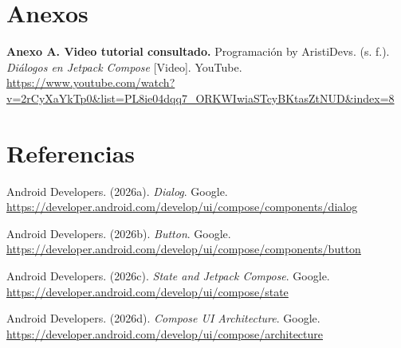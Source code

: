 \documentclass[12pt,a4paper]{article}
\newcommand{\entradafrancesa}[1]{%
  \par\noindent
  \hangindent=1.27cm
  \hangafter=1
  #1\par
}
\begin{document}
\clearpage
\section{Anexos}

\begingroup
\setlength{\parindent}{0pt}
\setlength{\parskip}{12pt}

\entradafrancesa{\textbf{Anexo A. Video tutorial consultado.} Programación by AristiDevs. (s. f.). \textit{Diálogos en Jetpack Compose} [Video]. YouTube. \url{https://www.youtube.com/watch?v=2rCyXaYkTp0&list=PL8ie04dqq7_ORKWIwiaSTcyBKtasZtNUD&index=8}}

\endgroup

\clearpage
\section{Referencias}

\begingroup
{}
\setlength{\parindent}{0pt}
\setlength{\parskip}{12pt}

\entradafrancesa{Android Developers. (2026a). \textit{Dialog}. Google. \url{https://developer.android.com/develop/ui/compose/components/dialog}}

\entradafrancesa{Android Developers. (2026b). \textit{Button}. Google. \url{https://developer.android.com/develop/ui/compose/components/button}}

\entradafrancesa{Android Developers. (2026c). \textit{State and Jetpack Compose}. Google. \url{https://developer.android.com/develop/ui/compose/state}}

\entradafrancesa{Android Developers. (2026d). \textit{Compose UI Architecture}. Google. \url{https://developer.android.com/develop/ui/compose/architecture}}

\endgroup
\end{document}
